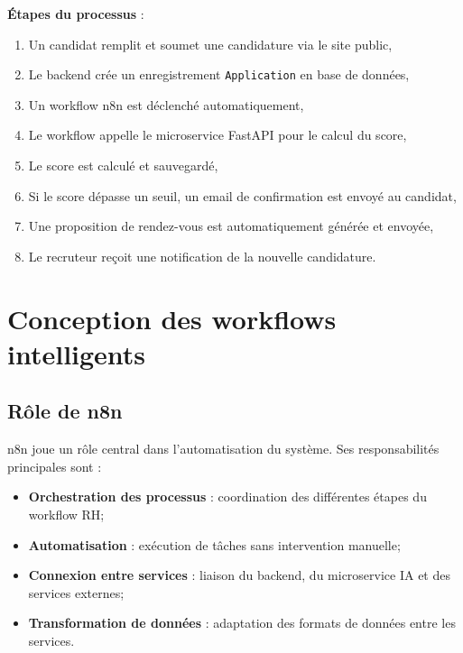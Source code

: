 \textbf{Étapes du processus} :

\begin{enumerate}
    \item Un candidat remplit et soumet une candidature via le site public,
    \item Le backend crée un enregistrement \texttt{Application} en base de données,
    \item Un workflow n8n est déclenché automatiquement,
    \item Le workflow appelle le microservice FastAPI pour le calcul du score,
    \item Le score est calculé et sauvegardé,
    \item Si le score dépasse un seuil, un email de confirmation est envoyé au candidat,
    \item Une proposition de rendez-vous est automatiquement générée et envoyée,
    \item Le recruteur reçoit une notification de la nouvelle candidature.
\end{enumerate}


\section{Conception des workflows intelligents}
\label{sec:conception-workflows}

\subsection{Rôle de n8n}
\label{subsec:role-n8n}

n8n joue un rôle central dans l'automatisation du système. Ses responsabilités principales sont :

\begin{itemize}
    \item \textbf{Orchestration des processus} : coordination des différentes étapes du workflow RH;
    
    \item \textbf{Automatisation} : exécution de tâches sans intervention manuelle;
    
    \item \textbf{Connexion entre services} : liaison du backend, du microservice IA et des services externes;
    
    \item \textbf{Transformation de données} : adaptation des formats de données entre les services.
\end{itemize}

